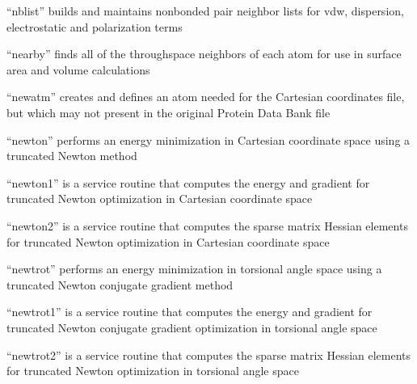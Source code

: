 \documentclass[letterpaper,11pt,english]{sphinxmanual}
\begin{document}
\sphinxAtStartPar
“nblist” builds and maintains nonbonded pair neighbor lists for vdw, dispersion, electrostatic and polarization terms

\sphinxAtStartPar
{}

\sphinxAtStartPar
“nearby” finds all of the through\sphinxhyphen{}space neighbors of each atom for use in surface area and volume calculations

\sphinxAtStartPar
{}

\sphinxAtStartPar
{}

\sphinxAtStartPar
“newatm” creates and defines an atom needed for the Cartesian coordinates file, but which may not present in the original Protein Data Bank file

\sphinxAtStartPar
{}

\sphinxAtStartPar
“newton” performs an energy minimization in Cartesian coordinate space using a truncated Newton method

\sphinxAtStartPar
{}

\sphinxAtStartPar
“newton1” is a service routine that computes the energy and gradient for truncated Newton optimization in Cartesian coordinate space

\sphinxAtStartPar
{}

\sphinxAtStartPar
“newton2” is a service routine that computes the sparse matrix Hessian elements for truncated Newton optimization in Cartesian coordinate space

\sphinxAtStartPar
{}

\sphinxAtStartPar
“newtrot” performs an energy minimization in torsional angle space using a truncated Newton conjugate gradient method

\sphinxAtStartPar
{}

\sphinxAtStartPar
“newtrot1” is a service routine that computes the energy and gradient for truncated Newton conjugate gradient optimization in torsional angle space

\sphinxAtStartPar
{}

\sphinxAtStartPar
“newtrot2” is a service routine that computes the sparse matrix Hessian elements for truncated Newton optimization in torsional angle space

\sphinxAtStartPar
{}
\end{document}
